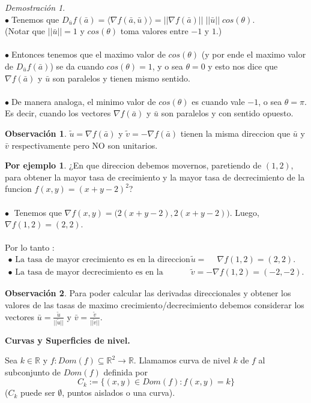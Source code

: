 \documentclass{article}
\theoremstyle{definition}
\theoremstyle{definition}
\newtheorem*{obs}{Observación}
\newtheorem*{ej}{Por ejemplo}
\theoremstyle{remark}
\newtheorem*{demo}{Demostración}
\newcommand\bl{$\bullet\;$}
\begin{document}
\begin{demo}
  \; \\
  \bl Tenemos que $D_{\bar{u}}f(\bar{a})=\big\langle \nabla f(\bar{a},\bar{u})\big\rangle = || \nabla f(\bar{a})||\; ||\bar{u}|| \; cos(\theta)$. \\ \big(Notar que $||\bar{u}||=1$ y $cos(\theta)$ toma valores entre $-1$ y $1$.\big)\\\\ \bl Entonces tenemos que el maximo valor de $cos(\theta)$ \big(y por ende el maximo valor de $D_{\bar{u}}f(\bar{a})$\big) se da cuando $cos(\theta)=1$, y o sea $\theta=0$ y esto nos dice que $\nabla f(\bar{a})$ y $\bar{u}$ son paralelos y tienen mismo sentido. \\\\
  \bl De manera analoga, el minimo valor de $cos(\theta)$ es cuando vale $-1$, o sea $\theta=\pi$. Es decir, cuando los vectores $\nabla f(\bar{a})$ y $\bar{u}$ son paralelos y con sentido opuesto.
\end{demo}
\begin{obs}
  $\tilde{u}=\nabla f(\bar{a})$ y $\tilde{v}=-\nabla f(\bar{a})$ tienen la misma direccion que $\bar{u}$ y $\bar{v}$ respectivamente pero NO son unitarios.
\end{obs}
\pagebreak
\begin{ej}
  ¿En que direccion debemos movernos, paretiendo de $(1,2)$, para obtener la mayor tasa de crecimiento y la mayor tasa de decrecimiento de la funcion $f(x,y)=(x+y-2)^2$? \\\\
  \textcolor{rojop2}{\bl} Tenemos que $\nabla f(x,y)=\big(2(x+y-2),2(x+y-2)\big).$ Luego, $\nabla f(1,2)=(2,2)$. \\\\
  Por lo tanto : \[
    \begin{array}{ll}
    \bullet \text{ La tasa de mayor crecimiento es en la direccion }& \tilde{u}=\phantom{-}\nabla f(1,2)=(2,2). \\
    \bullet \text{ La tasa de mayor decrecimiento es en la direccion} & \tilde{v}=-\nabla f(1,2)=(-2,-2).
  \end{array}
  \]
\end{ej}
\begin{obs}
  Para poder calcular las derivadas direccionales y obtener los valores de las tasas de maximo crecimiento/decrecimiento debemos considerar los vectores $\bar{u}=\frac{\tilde{u}}{||\tilde{u}||}$ y $\bar{v}=\frac{\tilde{v}}{||\tilde{v}||}$.
\end{obs}\pagebreak
\begin{center}
\textbf{Curvas y Superficies de nivel.}
\end{center}
\begin{defi}
  Sea $k \in \mathbb{R}$ y $f : Dom(f) \subseteq \mathbb{R}^2 \to \mathbb{R}$. Llamamos curva de nivel $k$ de $f$ al subconjunto de $Dom(f)$ definida por \[
    C_k:=\big\{(x,y) \in Dom(f) : f(x,y) = k\big\}
  \]
  \big($C_k$ puede ser $\emptyset$, puntos aislados o una curva\big).
\end{defi}
\end{document}
